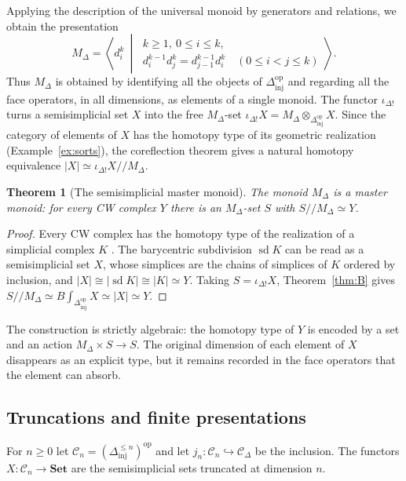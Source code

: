 \documentclass[11pt]{amsart}
\newtheorem{theorem}[teo]{Theorem}
\theoremstyle{definition}
\theoremstyle{remark}
\numberwithin{figure}{section}%
\newcommand{\CC}{\mathcal{C}}
\DeclareMathOperator{\sd}{sd}
\newcommand{\Set}{\mathbf{Set}}
\newcommand{\Dinj}{\Delta_{\mathrm{inj}}}
\newcommand{\op}{\mathrm{op}}
\begin{document}
Applying the description of the universal monoid by generators and relations, we obtain the presentation
\[
M_\Delta=\left\langle d_i^k\ \middle|\ \begin{array}{l} k\geq1,\ 0\leq i\leq k,\\[2pt] d_i^{k-1}d_j^k=d_{j-1}^{k-1}d_i^k\quad(0\leq i<j\leq k)\end{array}\right\rangle.
\]
Thus $M_\Delta$ is obtained by identifying all the objects of $\Dinj^{\op}$ and regarding all the face operators, in all dimensions, as elements of a single monoid. The functor $\iota_{\Delta!}$ turns a semisimplicial set $X$ into the free $M_\Delta$-set $\iota_{\Delta!}X=M_\Delta\otimes_{\Dinj^{\op}}X$. Since the category of elements of $X$ has the homotopy type of its geometric realization (Example~\ref{ex:sorts}), the coreflection theorem gives a natural homotopy equivalence $|X|\simeq\iota_{\Delta!}X/\!/M_\Delta$.

\begin{theorem}[The semisimplicial master monoid]
\label{thm:semisimplicial-master}
The monoid $M_\Delta$ is a master monoid: for every CW complex $Y$ there is an $M_\Delta$-set $S$ with $S/\!/M_\Delta\simeq Y$.
\end{theorem}

\begin{proof}
Every CW complex has the homotopy type of the realization of a simplicial complex $K$ \cite[Thm.~2, case $n=1$]{Milnor59}. The barycentric subdivision $\sd K$ can be read as a semisimplicial set $X$, whose simplices are the chains of simplices of $K$ ordered by inclusion, and $|X|\cong|\sd K|\cong|K|\simeq Y$. Taking $S=\iota_{\Delta!}X$, Theorem~\ref{thm:B} gives $S/\!/M_\Delta\simeq B\!\int_{\Dinj^{\op}}X\simeq|X|\simeq Y$.
\end{proof}

The construction is strictly algebraic: the homotopy type of $Y$ is encoded by a set and an action $M_\Delta\times S\to S$. The original dimension of each element of $X$ disappears as an explicit type, but it remains recorded in the face operators that the element can absorb.

\subsection{Truncations and finite presentations}
\label{subsec:semisimplicial-truncations}

For $n\geq0$ let $\CC_n=(\Dinj^{\leq n})^{\op}$ and let $j_n\colon\CC_n\hookrightarrow\CC_\Delta$ be the inclusion. The functors $X\colon\CC_n\to\Set$ are the semisimplicial sets truncated at dimension $n$.
\end{document}
